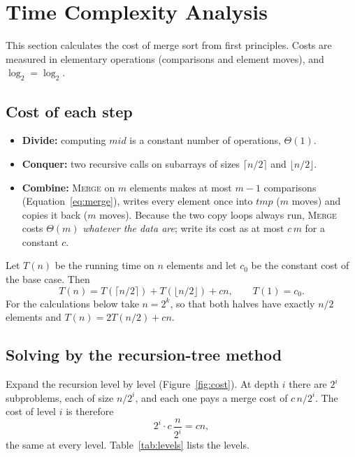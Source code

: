 \documentclass[11pt,a4paper]{article}
\theoremstyle{plain}
\theoremstyle{definition}
\renewcommand{\lg}{\log_2}
\begin{document}
\section{Time Complexity Analysis}\label{sec:complexity}
This section calculates the cost of merge sort from first principles. Costs are measured in elementary operations (comparisons and element moves), and $\lg=\log_2$.

\subsection{Cost of each step}
\begin{itemize}
  \item \textbf{Divide:} computing $mid$ is a constant number of operations, $\Theta(1)$.
  \item \textbf{Conquer:} two recursive calls on subarrays of sizes $\lceil n/2\rceil$ and $\lfloor n/2\rfloor$.
  \item \textbf{Combine:} \textsc{Merge} on $m$ elements makes at most $m-1$ comparisons (Equation~\ref{eq:merge}), writes every element once into $tmp$ ($m$ moves) and copies it back ($m$ moves). Because the two copy loops always run, \textsc{Merge} costs $\Theta(m)$ \emph{whatever the data are}; write its cost as at most $c\,m$ for a constant $c$.
\end{itemize}
Let $T(n)$ be the running time on $n$ elements and let $c_0$ be the constant cost of the base case. Then
\begin{equation}
  T(n)=T(\lceil n/2\rceil)+T(\lfloor n/2\rfloor)+cn,\qquad T(1)=c_0.
  \label{eq:rec}
\end{equation}
For the calculations below take $n=2^k$, so that both halves have exactly $n/2$ elements and $T(n)=2T(n/2)+cn$.

\subsection{Solving by the recursion-tree method}
Expand the recursion level by level (Figure~\ref{fig:cost}). At depth $i$ there are $2^i$ subproblems, each of size $n/2^i$, and each one pays a merge cost of $c\,n/2^i$. The cost of level $i$ is therefore
\[
  2^i\cdot c\,\frac{n}{2^i}=cn,
\]
the same at every level. Table~\ref{tab:levels} lists the levels.
\end{document}
